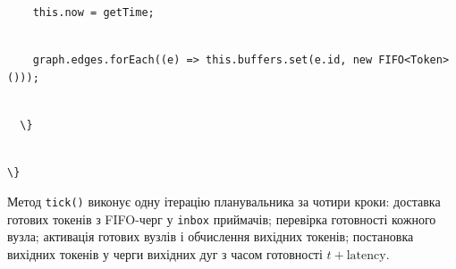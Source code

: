 \documentclass[
]{article}
\newcommand{\passthrough}[1]{#1}
\begin{document}
\passthrough{\lstinline!    !}\passthrough{\lstinline!this.now!}\passthrough{\lstinline! !}\passthrough{\lstinline!=!}\passthrough{\lstinline! !}\passthrough{\lstinline!getTime!}\passthrough{\lstinline!;!}\strut \\
\passthrough{\lstinline!    !}\passthrough{\lstinline!graph.edges.forEach!}\passthrough{\lstinline!((e)!}\passthrough{\lstinline! !}\passthrough{\lstinline!=>!}\passthrough{\lstinline! !}\passthrough{\lstinline!this.buffers.set!}\passthrough{\lstinline!(e.id,!}\passthrough{\lstinline! !}\passthrough{\lstinline!new!}\passthrough{\lstinline! !}\passthrough{\lstinline!FIFO<Token>()));!}\strut \\
\passthrough{\lstinline!  !}\passthrough{\lstinline!\}!}\strut \\
\passthrough{\lstinline!\}!}

Метод \passthrough{\lstinline!tick!}\passthrough{\lstinline!()!} виконує
одну ітерацію планувальника за чотири кроки: доставка готових токенів з
FIFO-черг у \passthrough{\lstinline!inbox!} приймачів; перевірка
готовності кожного вузла; активація готових вузлів і обчислення вихідних
токенів; постановка вихідних токенів у черги вихідних дуг з часом
готовності \(t + \text{latency}\).
\end{document}
